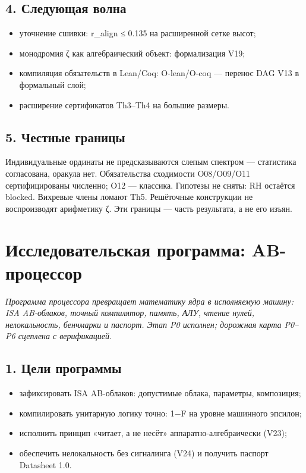 \documentclass[11pt,a4paper]{article}
\begin{document}
\subsection{4. Следующая волна}

\begin{itemize}
  \item уточнение сшивки: r\_align ≤ 0.135 на расширенной сетке высот;
  \item монодромия ζ как алгебраический объект: формализация V19;
  \item компиляция обязательств в Lean/Coq: O-lean/O-coq — перенос DAG V13 в формальный слой;
  \item расширение сертификатов Th3–Th4 на большие размеры.
\end{itemize}

\subsection{5. Честные границы}

Индивидуальные ординаты не предсказываются слепым спектром — статистика согласована, оракула нет. Обязательства сходимости O08/O09/O11 сертифицированы численно; O12 — классика. Гипотезы не сняты: RH остаётся blocked. Вихревые члены ломают Th5. Решёточные конструкции не воспроизводят арифметику ζ. Эти границы — часть результата, а не его изъян.

\section{Исследовательская программа: AB-процессор}

\noindent\textit{\color{copper}Программа процессора превращает математику ядра в исполняемую машину: ISA AB-облаков, точный компилятор, память, АЛУ, чтение нулей, нелокальность, бенчмарки и паспорт. Этап P0 исполнен; дорожная карта P0–P6 сцеплена с верификацией.}

\subsection{1. Цели программы}

\begin{itemize}
  \item зафиксировать ISA AB-облаков: допустимые облака, параметры, композиция;
  \item компилировать унитарную логику точно: 1−F на уровне машинного эпсилон;
  \item исполнить принцип «читает, а не несёт» аппаратно-алгебраически (V23);
  \item обеспечить нелокальность без сигналинга (V24) и получить паспорт Datasheet 1.0.
\end{itemize}
\end{document}
